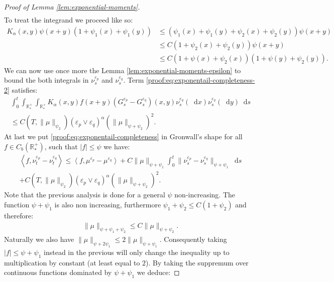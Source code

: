 \documentclass[11pt,a4paper]{article}
\newcommand{\RRP}{\mathbb{R}^+_*}
\newcommand{\brac}[1]{\left\langle#1\right\rangle}
\newcommand{\dd}{\mathop{}\!\mathrm{d}}
\begin{document}
\begin{proof}[Proof of Lemma \ref{lem:exponential-moments}]
\begin{multline*}
    \end{multline*}
    To treat the integrand we proceed like so:
    \begin{align*}
        K_\alpha(x,y)\psi(x+y)\left(1 + \psi_1(x) + \psi_1(y) \right) 
        &\leq \left(\psi_1(x) + \psi_1(y) + \psi_2(x) + \psi_2(y)\right)\psi(x+y) \\
        &\leq C\left(1 + \psi_2(x) + \psi_2(y)\right)\psi(x+y) \\
        &\leq C\left(1 + \psi(x) + \psi_2(x)\right)\left(1 + \psi(y)+ \psi_2(y)\right).
    \end{align*}
    We can now use once more the Lemma \ref{lem:exponential-moments-epsilon} to bound the both integrals in $ \nu_s^{\varepsilon_p}$ and $\nu_s^{\varepsilon_q}$. Term \eqref{proof:eq:exponentail-completeness-2} satisfies:
    \begin{align*}
        \int_0^t\int_{\RRP}\int_{\RRP}K_\alpha(x,y)f(x+y) (G^{\varepsilon_p}_s - G^{\varepsilon_q}_s)(x,y)\nu_s^{\varepsilon_q}(\dd x)\nu_s^{\varepsilon_q}(\dd y) \dd s \\
        \leq C\left(T,\|\mu\|_{\psi_2}\right)\left(\varepsilon_p \vee \varepsilon_q \right)^{\alpha} \left(\|\mu\|_{\psi + \psi_2}\right)^2.
    \end{align*}
    At last we put \eqref{proof:eq:exponentail-completeness} in Gronwall's shape for all $f \in C_b(\RRP)$, such that  $|f| \leq \psi$ we have:
    \begin{multline*}
        \brac{f,\nu_t^{\varepsilon_p}-\nu_t^{\varepsilon_q}} \leq  \brac{f,\mu^{\varepsilon_p} - \mu^{\varepsilon_q}} + C\|\mu\|_{\psi + \psi_1}\int_0^t \|\nu_s^{\varepsilon_p}-\nu_s^{\varepsilon_q}\|_{\psi + \psi_1}\dd s \\
        + C\left(T,\|\mu\|_{\psi_2}\right)\left(\varepsilon_p \vee \varepsilon_q \right)^{\alpha} \left(\|\mu\|_{\psi + \psi_2}\right)^2.
    \end{multline*}
    Note that the previous analysis is done for a general $\psi$ non-increasing. The function $\psi + \psi_1$ is also non increasing, furthermore $\psi_1 + \psi_2 \leq C(1 + \psi_2)$ and therefore:
    \begin{align*}
        \|\mu\|_{\psi + \psi_1 + \psi_2} \leq C\|\mu\|_{\psi + \psi_2}.
    \end{align*}
    Naturally we also have $\|\mu\|_{\psi + 2\psi_1} \leq 2 \|\mu\|_{\psi + \psi_1}$. Consequently taking $|f| \leq \psi + \psi_1$ instead in the previous will only change the inequality up to multiplication by constant (at least equal to $2$). By taking the suppremum over continuous functions dominated by $\psi + \psi_1$ we deduce:

\end{proof}
\end{document}
